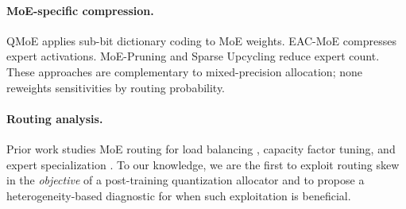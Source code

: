 \paragraph{MoE-specific compression.}
QMoE \citep{frantar2023qmoe} applies sub-bit dictionary coding to MoE weights. EAC-MoE \citep{chen2025eacmoe} compresses expert activations. MoE-Pruning \citep{yang2024moei2} and Sparse Upcycling \citep{komatsuzaki2023sparseupcycling} reduce expert count. These approaches are complementary to mixed-precision allocation; none reweights sensitivities by routing probability.

\paragraph{Routing analysis.}
Prior work studies MoE routing for load balancing \citep{fedus2022switch}, capacity factor tuning, and expert specialization \citep{zhou2022expertchoice}. To our knowledge, we are the first to exploit routing skew in the \emph{objective} of a post-training quantization allocator and to propose a heterogeneity-based diagnostic for when such exploitation is beneficial.